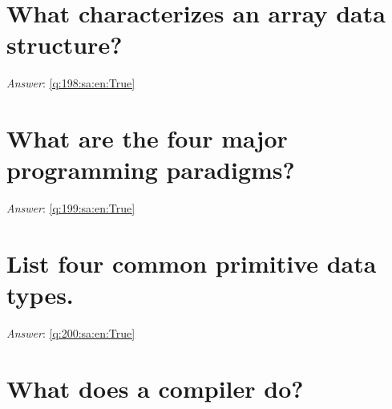 \documentclass[a4paper,11pt,oneside]{book}
\begin{document}
\begin{sloppypar}
\section{What characterizes an array data structure?}

\label{q:198:sa:en:False}

\vspace{2cm}

\noindent\makebox[\textwidth]{\hrulefill}

\vspace{1cm}

\textit{Answer}: \autoref{q:198:sa:en:True}



\section{What are the four major programming paradigms?}

\label{q:199:sa:en:False}

\vspace{2cm}

\noindent\makebox[\textwidth]{\hrulefill}

\vspace{1cm}

\textit{Answer}: \autoref{q:199:sa:en:True}



\section{List four common primitive data types.}

\label{q:200:sa:en:False}

\vspace{2cm}

\noindent\makebox[\textwidth]{\hrulefill}

\vspace{1cm}

\textit{Answer}: \autoref{q:200:sa:en:True}



\section{What does a compiler do?}

\label{q:201:sa:en:False}

\vspace{2cm}

\noindent\makebox[\textwidth]{\hrulefill}


\end{sloppypar}
\end{document}
